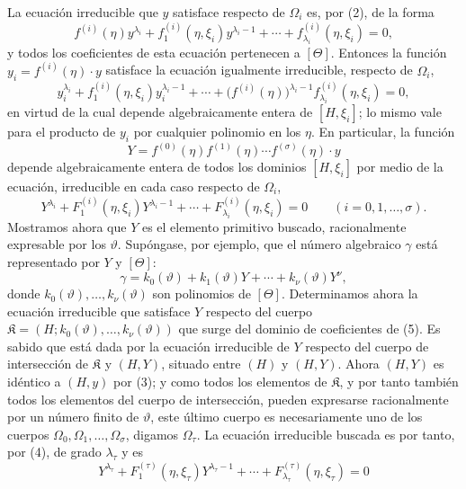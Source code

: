 \documentclass[11pt]{article}
\begin{document}
La ecuación irreducible que $y$ satisface respecto de $\Omega_i$ es, por (2), de la forma
\[
 f^{(i)}(\eta)y^{\lambda_i}+f_1^{(i)}(\eta,\xi_i)y^{\lambda_i-1}
+\cdots+f_{\lambda_i}^{(i)}(\eta,\xi_i)=0,
\]
y todos los coeficientes de esta ecuación pertenecen a $[\Theta]$. Entonces la función $y_i=f^{(i)}(\eta)\cdot y$ satisface la ecuación igualmente irreducible, respecto de $\Omega_i$,
\[
 y_i^{\lambda_i}+f_1^{(i)}(\eta,\xi_i)y_i^{\lambda_i-1}
+\cdots+\bigl(f^{(i)}(\eta)\bigr)^{\lambda_i-1}
 f_{\lambda_i}^{(i)}(\eta,\xi_i)=0,
\]
en virtud de la cual depende algebraicamente entera de $[H,\xi_i]$; lo mismo vale para el producto de $y_i$ por cualquier polinomio en los $\eta$. En particular, la función
\begin{equation}
Y=f^{(0)}(\eta)f^{(1)}(\eta)\cdots f^{(\sigma)}(\eta)\cdot y
\tag{3}
\end{equation}
depende algebraicamente entera de todos los dominios $[H,\xi_i]$ por medio de la ecuación, irreducible en cada caso respecto de $\Omega_i$,
\begin{equation}
Y^{\lambda_i}+F_1^{(i)}(\eta,\xi_i)Y^{\lambda_i-1}
+\cdots+F_{\lambda_i}^{(i)}(\eta,\xi_i)=0
\qquad (i=0,1,\ldots,\sigma).
\tag{4}
\end{equation}
Mostramos ahora que $Y$ es el elemento primitivo buscado, racionalmente expresable por los $\vartheta$. Supóngase, por ejemplo, que el número algebraico $\gamma$ está representado por $Y$ y $[\Theta]$:
\begin{equation}
\gamma=k_0(\vartheta)+k_1(\vartheta)Y+\cdots+k_\nu(\vartheta)Y^\nu,
\tag{5}
\end{equation}
donde $k_0(\vartheta),\ldots,k_\nu(\vartheta)$ son polinomios de $[\Theta]$. Determinamos ahora la ecuación irreducible que satisface $Y$ respecto del cuerpo
$\mathfrak K=(H;k_0(\vartheta),\ldots,k_\nu(\vartheta))$ que surge del dominio de coeficientes de (5). Es sabido que está dada por la ecuación irreducible de $Y$ respecto del cuerpo de intersección de $\mathfrak K$ y $(H,Y)$, situado entre $(H)$ y $(H,Y)$. Ahora $(H,Y)$ es idéntico a $(H,y)$ por (3); y como todos los elementos de $\mathfrak K$, y por tanto también todos los elementos del cuerpo de intersección, pueden expresarse racionalmente por un número finito de $\vartheta$, este último cuerpo es necesariamente uno de los cuerpos $\Omega_0,\Omega_1,\ldots,\Omega_\sigma$, digamos $\Omega_\tau$. La ecuación irreducible buscada es por tanto, por (4), de grado $\lambda_\tau$ y es
\begin{equation}
Y^{\lambda_\tau}+F_1^{(\tau)}(\eta,\xi_\tau)Y^{\lambda_\tau-1}
+\cdots+F_{\lambda_\tau}^{(\tau)}(\eta,\xi_\tau)=0
\tag{6}
\end{equation}
\end{document}
